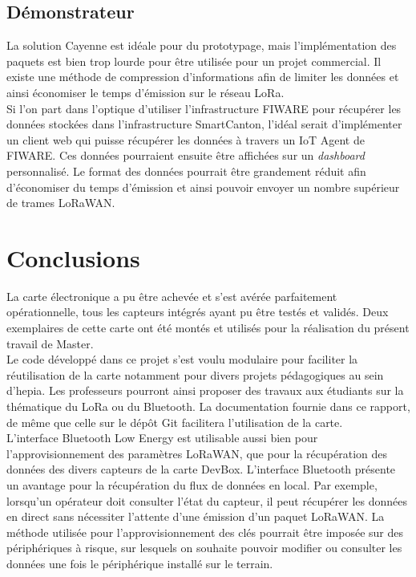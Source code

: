 \subsection{Démonstrateur}

La solution Cayenne est idéale pour du prototypage, mais l'implémentation des paquets est bien trop lourde pour être utilisée pour un projet commercial. Il existe une méthode de compression d'informations afin de limiter les données et ainsi économiser le temps d'émission sur le réseau LoRa. \\

Si l'on part dans l'optique d'utiliser l'infrastructure FIWARE pour récupérer les données stockées dans l'infrastructure SmartCanton, l'idéal serait d'implémenter un client web qui puisse récupérer les données à travers un IoT Agent de FIWARE. Ces données pourraient ensuite être affichées sur un \textit{dashboard} personnalisé. Le format des données pourrait être grandement réduit afin d'économiser du temps d'émission et ainsi pouvoir envoyer un nombre supérieur de trames LoRaWAN.



\newpage
\section{Conclusions}


La carte électronique a pu être achevée et s'est avérée parfaitement opérationnelle, tous les capteurs intégrés ayant pu être testés et validés. Deux exemplaires de cette carte ont été montés et utilisés pour la réalisation du présent travail de Master. \\

Le code développé dans ce projet s'est voulu modulaire pour faciliter la réutilisation de la carte notamment pour divers projets pédagogiques au sein d'hepia. Les professeurs pourront ainsi proposer des travaux aux étudiants sur la thématique du LoRa ou du Bluetooth. La documentation fournie dans ce rapport, de même que celle sur le dépôt Git facilitera l'utilisation de la carte. \\

L'interface Bluetooth Low Energy est utilisable aussi bien pour l'approvisionnement des paramètres LoRaWAN, que pour la récupération des données des divers capteurs de la carte DevBox. L'interface Bluetooth présente un avantage pour la récupération du flux de données en local. Par exemple, lorsqu'un opérateur doit consulter l'état du capteur, il peut récupérer les données en direct sans nécessiter l'attente d'une émission d'un paquet LoRaWAN. La méthode utilisée pour l'approvisionnement des clés pourrait être imposée sur des périphériques à risque, sur lesquels on souhaite pouvoir modifier ou consulter les données une fois le périphérique installé sur le terrain. \\


